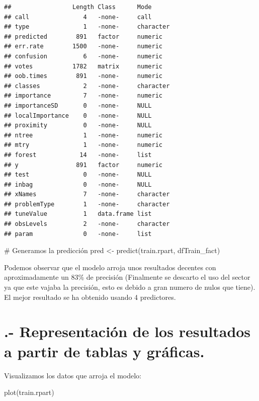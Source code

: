 \documentclass[
]{article}
\newenvironment{Shaded}{\begin{snugshade}}{\end{snugshade}}
\newcommand{\CommentTok}[1]{\textcolor[rgb]{0.50,0.62,0.50}{#1}}
\newcommand{\KeywordTok}[1]{\textcolor[rgb]{0.94,0.87,0.69}{#1}}
\newcommand{\NormalTok}[1]{\textcolor[rgb]{0.80,0.80,0.80}{#1}}
\newcommand{\StringTok}[1]{\textcolor[rgb]{0.80,0.58,0.58}{#1}}
\begin{document}
\begin{verbatim}
##                 Length Class      Mode     
## call               4   -none-     call     
## type               1   -none-     character
## predicted        891   factor     numeric  
## err.rate        1500   -none-     numeric  
## confusion          6   -none-     numeric  
## votes           1782   matrix     numeric  
## oob.times        891   -none-     numeric  
## classes            2   -none-     character
## importance         7   -none-     numeric  
## importanceSD       0   -none-     NULL     
## localImportance    0   -none-     NULL     
## proximity          0   -none-     NULL     
## ntree              1   -none-     numeric  
## mtry               1   -none-     numeric  
## forest            14   -none-     list     
## y                891   factor     numeric  
## test               0   -none-     NULL     
## inbag              0   -none-     NULL     
## xNames             7   -none-     character
## problemType        1   -none-     character
## tuneValue          1   data.frame list     
## obsLevels          2   -none-     character
## param              0   -none-     list
\end{verbatim}

\begin{Shaded}
\begin{Highlighting}[]
\CommentTok{# Generamos la predicción}
\NormalTok{pred <-}\StringTok{ }\KeywordTok{predict}\NormalTok{(train.rpart, dfTrain_fact)}
\end{Highlighting}
\end{Shaded}

Podemos observar que el modelo arroja unos resultados decentes con
aproximadamente un 83\% de precisión (Finalmente se descarto el uso del
sector ya que este vajaba la precisión, esto es debido a gran numero de
nulos que tiene). El mejor resultado se ha obtenido usando 4
predictores.

\hypertarget{representaciuxf3n-de-los-resultados-a-partir-de-tablas-y-gruxe1ficas.}{%
\section{.- Representación de los resultados a partir de tablas y
gráficas.}\label{representaciuxf3n-de-los-resultados-a-partir-de-tablas-y-gruxe1ficas.}}

Visualizamos los datos que arroja el modelo:

\begin{Shaded}
\begin{Highlighting}[]
\KeywordTok{plot}\NormalTok{(train.rpart)}
\end{Highlighting}
\end{Shaded}
\end{document}
